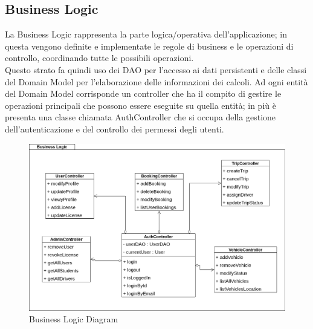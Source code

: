 \subsection{Business Logic}\label{subsec:BL}
La Business Logic rappresenta la parte logica/operativa dell'applicazione; in questa vengono definite e implementate le regole di business e le operazioni di controllo, coordinando tutte le possibili operazioni.\\
Questo strato fa quindi uso dei DAO per l'accesso ai dati persistenti e delle classi del Domain Model per l'elaborazione delle informazioni dei calcoli.
Ad ogni entità del Domain Model corrisponde un controller che ha il compito di gestire le operazioni principali che possono essere eseguite su quella entità; in più è presenta una classe chiamata AuthController che si occupa della gestione dell'autenticazione e del controllo dei permessi degli utenti.
\begin{figure}[H]
    \centering
    \includegraphics[width=1\linewidth]{Images/BusinessLogic_diag.png}
    \caption{Business Logic Diagram}
    \label{fig:BLdiag}
\end{figure}

